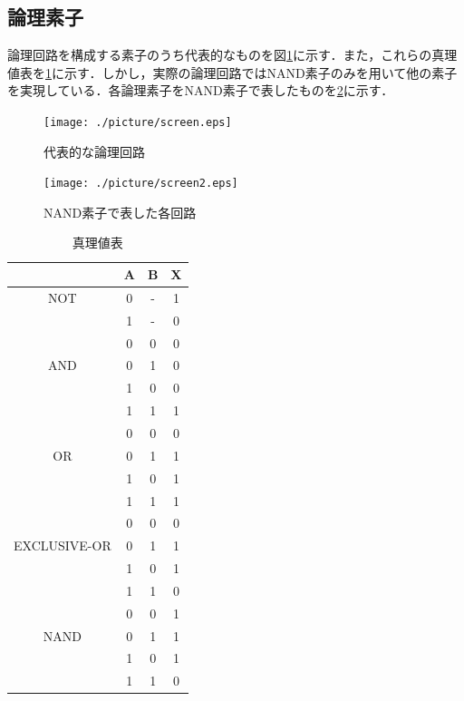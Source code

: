 \documentclass[11pt,a4paper]{jsarticle}
\begin{document}
  \subsection{論理素子}
  論理回路を構成する素子のうち代表的なものを図\ref{fig1}に示す．また，これらの真理値表を\ref{tab1}に示す．しかし，実際の論理回路ではNAND素子のみを用いて他の素子を実現している．各論理素子をNAND素子で表したものを\ref{fig2}に示す．

\newpage
\begin{figure}[hb]
 \begin{center}
  \texttt{[image: ./picture/screen.eps]}
 \end{center}
 \caption{代表的な論理回路}
\label{fig1}
\end{figure}


\begin{figure}[hb]
 \begin{center}
  \texttt{[image: ./picture/screen2.eps]}
 \end{center}
\caption{NAND素子で表した各回路}
\label{fig2}
\end{figure}


\begin{table}[ht]
 \begin{center}
  \caption{真理値表}
  \label{tab1}
  \begin{tabular}{|c|c|c|c|} \hline 
       & A & B & X \\ \hline \hline
   NOT & 0 & - & 1 \\ \cline{2-4}
       & 1 & - & 0 \\ \hline
       & 0 & 0 & 0 \\ \cline{2-4}
   AND & 0 & 1 & 0 \\ \cline{2-4}
       & 1 & 0 & 0 \\ \cline{2-4}
       & 1 & 1 & 1 \\ \hline
       & 0 & 0 & 0 \\ \cline{2-4}
   OR  & 0 & 1 & 1 \\ \cline{2-4}
       & 1 & 0 & 1 \\ \cline{2-4}
       & 1 & 1 & 1 \\ \hline
       & 0 & 0 & 0 \\ \cline{2-4}
EXCLUSIVE-OR & 0 & 1 & 1 \\ \cline{2-4}
       & 1 & 0 & 1 \\ \cline{2-4}
       & 1 & 1 & 0 \\ \hline
       & 0 & 0 & 1 \\ \cline{2-4}
  NAND & 0 & 1 & 1 \\ \cline{2-4}
       & 1 & 0 & 1 \\ \cline{2-4}
       & 1 & 1 & 0 \\ \hline
  \end{tabular}
 \end{center}
\end{table}
\end{document}
